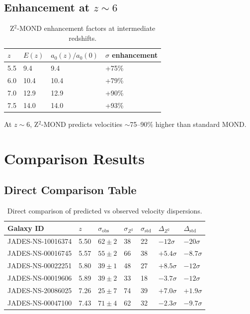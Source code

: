 \documentclass[12pt,a4paper]{article}
\begin{document}
\subsection{Enhancement at $z \sim 6$}

\begin{table}[h]
\centering
\begin{tabular}{@{}llll@{}}
\toprule
$z$ & $E(z)$ & $a_0(z)/a_0(0)$ & $\sigma$ enhancement \\
\midrule
5.5 & 9.4 & 9.4 & +75\% \\
6.0 & 10.4 & 10.4 & +79\% \\
7.0 & 12.9 & 12.9 & +90\% \\
7.5 & 14.0 & 14.0 & +93\% \\
\bottomrule
\end{tabular}
\caption{Z$^2$-MOND enhancement factors at intermediate redshifts.}
\end{table}

At $z \sim 6$, Z$^2$-MOND predicts velocities $\sim$75--90\% higher than standard MOND.

\section{Comparison Results}

\subsection{Direct Comparison Table}

\begin{table}[h]
\centering
\begin{tabular}{@{}lllllll@{}}
\toprule
Galaxy ID & $z$ & $\sigma_{\text{obs}}$ & $\sigma_{Z^2}$ & $\sigma_{\text{std}}$ & $\Delta_{Z^2}$ & $\Delta_{\text{std}}$ \\
\midrule
JADES-NS-10016374 & 5.50 & $62 \pm 2$ & 38 & 22 & $-12\sigma$ & $-20\sigma$ \\
JADES-NS-00016745 & 5.57 & $55 \pm 2$ & 66 & 38 & $+5.4\sigma$ & $-8.7\sigma$ \\
JADES-NS-00022251 & 5.80 & $39 \pm 1$ & 48 & 27 & $+8.5\sigma$ & $-12\sigma$ \\
JADES-NS-00019606 & 5.89 & $39 \pm 2$ & 33 & 18 & $-3.7\sigma$ & $-12\sigma$ \\
JADES-NS-20086025 & 7.26 & $25 \pm 7$ & 74 & 39 & $+7.0\sigma$ & $+1.9\sigma$ \\
JADES-NS-00047100 & 7.43 & $71 \pm 4$ & 62 & 32 & $-2.3\sigma$ & $-9.7\sigma$ \\
\bottomrule
\end{tabular}
\caption{Direct comparison of predicted vs observed velocity dispersions.}
\end{table}
\end{document}
